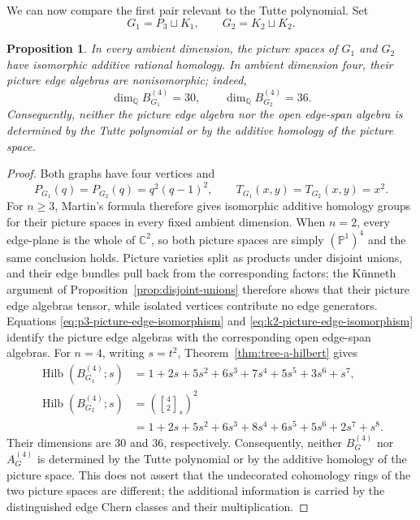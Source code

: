 \documentclass[11pt]{amsart}
\theoremstyle{plain}
\newtheorem{proposition}[theorem]{Proposition}
\theoremstyle{definition}
\theoremstyle{remark}
\newcommand{\Q}{\mathbb{Q}}
\newcommand{\C}{\mathbb{C}}
\newcommand{\PP}{\mathbb{P}}
\newcommand{\qbinom}[2]{\genfrac{[}{]}{0pt}{}{#1}{#2}}
\begin{document}
We can now compare the first pair relevant to the Tutte polynomial.  Set
\[
  G_1=P_3\sqcup K_1,
  \qquad
  G_2=K_2\sqcup K_2.
\]
\begin{proposition}\label{prop:picture-tutte-separation}
In every ambient dimension, the picture spaces of $G_1$ and $G_2$ have
isomorphic additive rational homology.  In ambient dimension four, their
picture edge algebras are nonisomorphic; indeed,
\[
  \dim_{\Q}B_{G_1}^{(4)}=30,
  \qquad
  \dim_{\Q}B_{G_2}^{(4)}=36.
\]
Consequently, neither the picture edge algebra nor the open edge-span algebra
is determined by the Tutte polynomial or by the additive homology of the
picture space.
\end{proposition}

\begin{proof}
Both graphs have four vertices and
\[
  P_{G_1}(q)=P_{G_2}(q)=q^2(q-1)^2,
  \qquad
  T_{G_1}(x,y)=T_{G_2}(x,y)=x^2.
\]
For $n\geq3$, Martin's formula \cite[Theorem~1]{MartinTopology} therefore gives
isomorphic additive homology groups for their picture spaces in every fixed
ambient dimension.  When $n=2$, every edge-plane is the whole of $\C^2$, so
both picture spaces are simply $(\PP^1)^4$ and the same conclusion holds.
Picture varieties split as products under disjoint unions, and their edge
bundles pull back from the corresponding factors; the K\"unneth argument of
Proposition~\ref{prop:disjoint-unions} therefore shows that their picture edge
algebras tensor, while isolated vertices contribute no edge generators.
Equations
\eqref{eq:p3-picture-edge-isomorphism} and
\eqref{eq:k2-picture-edge-isomorphism} identify the picture edge algebras
with the corresponding open edge-span algebras.  For $n=4$, writing $s=t^2$,
Theorem~\ref{thm:tree-a-hilbert} gives
\begin{align*}
  \operatorname{Hilb}(B_{G_1}^{(4)};s)
  &=1+2s+5s^2+6s^3+7s^4+5s^5+3s^6+s^7,\\
  \operatorname{Hilb}(B_{G_2}^{(4)};s)
  &=\left(\qbinom{4}{2}_s\right)^2\\
  &=1+2s+5s^2+6s^3+8s^4+6s^5+5s^6+2s^7+s^8.
\end{align*}
Their dimensions are $30$ and $36$, respectively.  Consequently, neither
$B_G^{(4)}$ nor $A_G^{(4)}$ is determined by the Tutte polynomial or by the
additive homology of the picture space.  This does not assert that the
undecorated cohomology rings of the two picture spaces are different; the
additional information is carried by the distinguished edge Chern classes
and their multiplication.
\end{proof}
\end{document}
